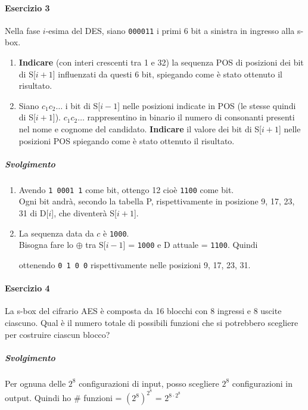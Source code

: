 \documentclass[10pt]{book}
\begin{document}
\paragraph{Esercizio 3} Nella fase $i$-esima del DES, siano \texttt{000011} i primi 6 bit a sinistra in ingresso alla s-box.
\begin{enumerate}
	\item \textbf{Indicare} (con interi crescenti tra 1 e 32) la sequenza POS di posizioni dei bit di S[$i+1$] influenzati da questi 6 bit, spiegando come è stato ottenuto il risultato.
	\item Siano $c_1 c_2\ldots$ i bit di S[$i-1$] nelle posizioni indicate in POS (le stesse quindi di S[$i+1$]). $c_1 c_2\ldots$ rappresentino in binario il numero di consonanti presenti nel nome e cognome del candidato. \textbf{Indicare} il valore dei bit di S[$i+1$] nelle posizioni POS spiegando come è stato ottenuto il risultato.
\end{enumerate}
\subparagraph{Svolgimento}
\begin{enumerate}
	\item Avendo \texttt{1 0001 1} come bit, ottengo 12 cioè \texttt{1100} come bit.\\
	Ogni bit andrà, secondo la tabella P, rispettivamente in posizione 9, 17, 23, 31 di D[$i$], che diventerà S[$i+1$].
	\item La sequenza data da $c$ è \texttt{1000}.\\
	Bisogna fare lo $\oplus$ tra S[$i-1$] = \texttt{1000} e D attuale = \texttt{1100}. Quindi
	\begin{list}{}{}
		\item S[9] = $1\oplus1 = 0$
		\item S[17] = $0\oplus1 = 1$
		\item S[23] = $0\oplus0 = 0$
		\item S[31] = $0\oplus0 = 0$
	\end{list}
	ottenendo \texttt{0 1 0 0} rispettivamente nelle posizioni 9, 17, 23, 31.
\end{enumerate}
\paragraph{Esercizio 4} La s-box del cifrario AES è composta da 16 blocchi con 8 ingressi e 8 uscite ciascuno. Qual è il numero totale di possibili funzioni che si potrebbero scegliere per costruire ciascun blocco?
\subparagraph{Svolgimento} Per ognuna delle $2^8$ configurazioni di input, posso scegliere $2^8$ configurazioni in output. Quindi ho \# funzioni = $\left(2^8\right)^{2^8}$ = $2^{8\cdot2^8}$
\end{document}
